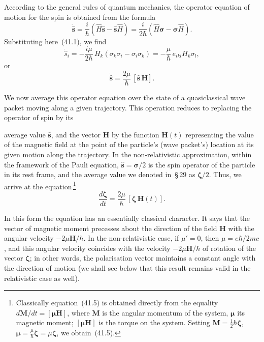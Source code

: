 According to the general rules of quantum mechanics, the operator equation of motion for the spin is obtained from the formula
\begin{equation}
\dot{\widehat{\mathbf{s}}} = \frac{i}{\hbar}(\widehat H\widehat{\mathbf{s}} - \widehat{\mathbf{s}}\widehat H) = \frac{i}{2\hbar}(\widehat H\boldsymbol{\sigma} - \boldsymbol{\sigma}\widehat H).
\tag{41.3}
\end{equation}
Substituting here~(41.1), we find
\[
\dot{\widehat s}_i = -\frac{i\mu}{2\hbar}\,H_k(\sigma_k\sigma_i - \sigma_i\sigma_k) = -\frac{\mu}{\hbar}\,e_{ikl}H_k\sigma_l,
\]
or
\begin{equation}
\dot{\widehat{\mathbf{s}}} = \frac{2\mu}{\hbar}\,[\widehat{\mathbf{s}}\,\mathbf{H}].
\tag{41.4}
\end{equation}

We now average this operator equation over the state of a quasiclassical wave packet moving along a given trajectory. This operation reduces to replacing the operator of spin by its

average value $\bar{\mathbf{s}}$, and the vector $\mathbf{H}$ by the function $\mathbf{H}(t)$ representing the value of the magnetic field at the point of the particle's (wave packet's) location at its given motion along the trajectory. In the non-relativistic approximation, within the framework of the Pauli equation, $\widehat{\mathbf{s}} = \boldsymbol{\sigma}/2$ is the spin operator of the particle in its rest frame, and the average value we denoted in~\S\,29 as $\boldsymbol{\zeta}/2$. Thus, we arrive at the equation\,\footnote{Classically equation~(41.5) is obtained directly from the equality $d\mathbf{M}/dt = [\boldsymbol{\mu}\mathbf{H}]$, where $\mathbf{M}$ is the angular momentum of the system, $\boldsymbol{\mu}$ its magnetic moment; $[\boldsymbol{\mu}\mathbf{H}]$ is the torque on the system. Setting $\mathbf{M} = \tfrac{1}{2}\hbar\boldsymbol{\zeta}$, $\boldsymbol{\mu} = \tfrac{\mu}{\hbar}\boldsymbol{\zeta} = \mu\boldsymbol{\zeta}$, we obtain~(41.5).}
\begin{equation}
\frac{d\boldsymbol{\zeta}}{dt} = \frac{2\mu}{\hbar}\,[\boldsymbol{\zeta}\,\mathbf{H}(t)].
\tag{41.5}
\end{equation}

In this form the equation has an essentially classical character. It says that the vector of magnetic moment precesses about the direction of the field $\mathbf{H}$ with the angular velocity $-2\mu\mathbf{H}/\hbar$. In the non-relativistic case, if $\mu' = 0$, then $\mu = e\hbar/2mc$, and this angular velocity coincides with the velocity $-2\mu\mathbf{H}/\hbar$ of rotation of the vector $\boldsymbol{\zeta}$; in other words, the polarisation vector maintains a constant angle with the direction of motion (we shall see below that this result remains valid in the relativistic case as well).

